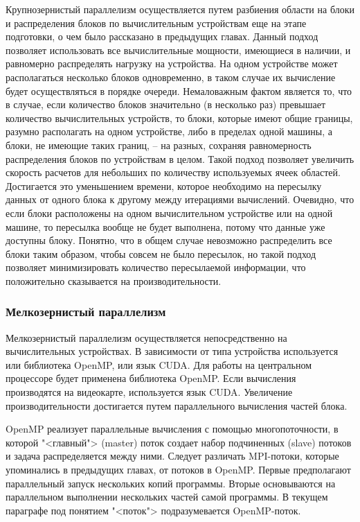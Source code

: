 \documentclass[a4paper, 14pt]{extarticle}
\theoremstyle{definition}
\begin{document}
\par Крупнозернистый параллелизм осуществляется путем разбиения области на блоки и распределения блоков по вычислительным устройствам еще на этапе подготовки, о чем было рассказано в предыдущих главах. Данный подход позволяет использовать все вычислительные мощности, имеющиеся в наличии, и равномерно распределять нагрузку на устройства. На одном устройстве может располагаться несколько блоков одновременно, в таком случае их вычисление будет осуществляться в порядке очереди. Немаловажным фактом является то, что в случае, если количество блоков значительно (в несколько раз) превышает количество вычислительных устройств, то блоки, которые имеют общие границы, разумно располагать на одном устройстве, либо в пределах одной машины, а блоки, не имеющие таких границ, -- на разных, сохраняя равномерность распределения блоков по устройствам в целом. Такой подход позволяет увеличить скорость расчетов для небольших по количеству используемых ячеек областей. Достигается это уменьшением времени, которое необходимо на пересылку данных от одного блока к другому между итерациями вычислений. Очевидно, что если блоки расположены на одном вычислительном устройстве или на одной машине, то пересылка вообще не будет выполнена, потому что данные уже доступны блоку. Понятно, что в общем случае невозможно распределить все блоки таким образом, чтобы совсем не было пересылок, но такой подход позволяет минимизировать количество пересылаемой информации, что положительно сказывается на производительности.



\subsubsection{Мелкозернистый параллелизм}

\par Мелкозернистый параллелизм осуществляется непосредственно на вычислительных устройствах. В зависимости от типа устройства используется или библиотека OpenMP, или язык CUDA. Для работы на центральном процессоре будет применена библиотека OpenMP. Если вычисления производятся на видеокарте, используется язык CUDA. Увеличение производительности достигается путем параллельного вычисления частей блока.

\par OpenMP реализует параллельные вычисления с помощью многопоточности, в которой "<главный"> (master) поток создает набор подчиненных (slave) потоков и задача распределяется между ними. Следует различать MPI-потоки, которые упоминались в предыдущих главах, от потоков в OpenMP. Первые предполагают параллельный запуск нескольких копий программы. Вторые основываются на параллельном выполнении нескольких частей самой программы. В текущем параграфе под понятием "<поток"> подразумевается OpenMP-поток.
\end{document}
